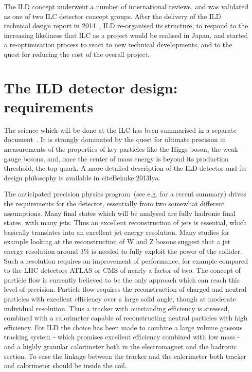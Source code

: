 \documentclass[%
 amsmath,amssymb,
 aps,
]{revtex4-1}
\begin{document}
The ILD concept underwent a number of international reviews, and was validated as one of two ILC detector concept groups. After the delivery of the ILD technical design report in 2014~\cite{Behnke:2013lya}, ILD re-organised its structure, to respond to the increasing likeliness that ILC as a project would be realised in Japan, and started a re-optimisation process to react to new technical developments, and to the quest for reducing the cost of the overall project. 

\section{The ILD detector design: requirements}
The science which will be done at the ILC has been summarised in a separate document~\cite{ILCESU1}. It is strongly dominated by the quest for ultimate precision in measurements of the properties of key particles like the Higgs boson, the weak gauge bosons, and, once the center of mass energy is beyond its production threshold, the top quark. A more detailed description of the ILD detector and its design philosophy is available in cite{Behnke:2013lya}.

The anticipated precision physics program~(see e.g. \cite{Fujii:2017vwa} for a recent summary) drives the requirements for the detector, essentially from two somewhat different assumptions. Many final states which will be analysed are fully hadronic final states, with many jets. Thus an excellent reconstruction of jets is essential, which basically translates into an excellent jet energy resolution. Many studies for example looking at the reconstruction of W and Z bosons suggest that a jet energy resolution around 3\% is needed to fully exploit the power of the collider. Such a resolution requires an improvement of performance, for example compared to the LHC detectors ATLAS or CMS of nearly a factor of two. The concept of particle flow is currently believed to be the only approach which can reach this level of precision. Particle flow requires the reconstruction of charged and neutral particles with excellent efficiency over a large solid angle, though at moderate individual resolution. Thus a tracker with outstanding efficiency is stressed, combined with a calorimeter capable of reconstructing neutral particles with high efficiency. For ILD the choice has been made to combine a large volume gaseous tracking system - which promises excellent efficiency combined with low mass - and a highly granular calorimeter both in the electromagnet and the hadronic section. To ease the linkage between the tracker and the calorimeter both tracker and calorimeter should be inside the coil. 
\end{document}
